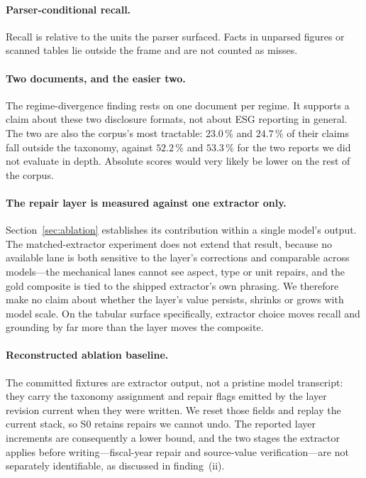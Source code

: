 \documentclass[3p,times]{elsarticle}
\begin{document}
\paragraph{Parser-conditional recall.} Recall is relative to the units the parser
surfaced. Facts in unparsed figures or scanned tables lie outside the frame and
are not counted as misses.

\paragraph{Two documents, and the easier two.} The regime-divergence finding rests
on one document per regime. It supports a claim about these two disclosure
formats, not about ESG reporting in general. The two are also the corpus's most
tractable: $23.0\,\%$ and $24.7\,\%$ of their claims fall outside the taxonomy,
against $52.2\,\%$ and $53.3\,\%$ for the two reports we did not evaluate in
depth. Absolute scores would very likely be lower on the rest of the corpus.

\paragraph{The repair layer is measured against one extractor only.} Section~\ref{sec:ablation}
establishes its contribution within a single model's output. The matched-extractor
experiment does not extend that result, because no available lane is both sensitive to the
layer's corrections and comparable across models---the mechanical lanes cannot see aspect,
type or unit repairs, and the gold composite is tied to the shipped extractor's own
phrasing. We therefore make no claim about whether the layer's value persists, shrinks or
grows with model scale. On the tabular surface specifically, extractor choice moves recall
and grounding by far more than the layer moves the composite.

\paragraph{Reconstructed ablation baseline.} The committed fixtures are extractor
output, not a pristine model transcript: they carry the taxonomy assignment and
repair flags emitted by the layer revision current when they were written. We
reset those fields and replay the current stack, so S0 retains repairs we cannot
undo. The reported layer increments are consequently a lower bound, and the two
stages the extractor applies before writing---fiscal-year repair and source-value
verification---are not separately identifiable, as discussed in finding~(ii).
\end{document}
